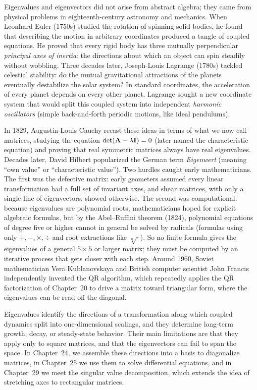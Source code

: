 \begin{historybox}
Eigenvalues and eigenvectors did not arise from abstract algebra; they came
from physical problems in eighteenth-century astronomy and mechanics. When
Leonhard Euler (1750s) studied the rotation of spinning solid bodies, he
found that describing the motion in arbitrary coordinates produced a tangle of
coupled equations. He proved that every rigid body has
three mutually perpendicular \emph{principal axes of inertia}: the
directions about which an object can spin steadily without wobbling.
Three decades later, Joseph-Louis Lagrange (1780s) tackled celestial stability:
do the mutual gravitational attractions of the planets eventually destabilize the
solar system? In standard coordinates, the acceleration of every planet
depends on every other planet. Lagrange sought a new coordinate system that would
split this coupled system into independent \emph{harmonic
oscillators} (simple back-and-forth periodic motions, like ideal pendulums).

In 1829, Augustin-Louis Cauchy recast these ideas in terms of what we now call
matrices, studying the equation $\det(\mathbf{A}-\lambda\mathbf{I})=0$ (later named the
characteristic equation) and proving that real symmetric matrices always have
real eigenvalues. Decades
later, David Hilbert popularized the German term \emph{Eigenwert} (meaning ``own
value'' or ``characteristic value''). Two hurdles caught early mathematicians.
The first was the defective matrix: early geometers assumed every linear transformation
had a full set of invariant axes, and shear matrices, with only a single line of
eigenvectors, showed otherwise. The second was computational: because
eigenvalues are polynomial roots, mathematicians hoped for explicit algebraic formulas,
but by the Abel--Ruffini theorem (1824), polynomial equations of degree five or higher
cannot in general be solved by radicals (formulas using only $+,-,\times,\div$ and
root extractions like $\sqrt[n]{\cdot}$). So no finite formula gives the eigenvalues
of a general $5\times 5$ or larger matrix; they must be computed by an iterative
process that gets closer with each step. Around 1960, Soviet mathematician Vera
Kublanovskaya and British computer scientist John Francis independently invented
the QR algorithm, which repeatedly applies the QR factorization of
Chapter~20 to drive a matrix toward triangular form, where
the eigenvalues can be read off the diagonal.

Eigenvalues identify the directions of a transformation along which
coupled dynamics split into one-dimensional scalings, and they determine
long-term growth, decay, or steady-state behavior. Their main
limitations are that they apply only to square matrices, and that the eigenvectors
can fail to span the space. In Chapter~24, we assemble these directions
into a basis to diagonalize matrices, in Chapter~25 we use them to solve
differential equations, and in Chapter~29 we meet the singular value decomposition, which extends
the idea of stretching axes to rectangular matrices.
\end{historybox}

